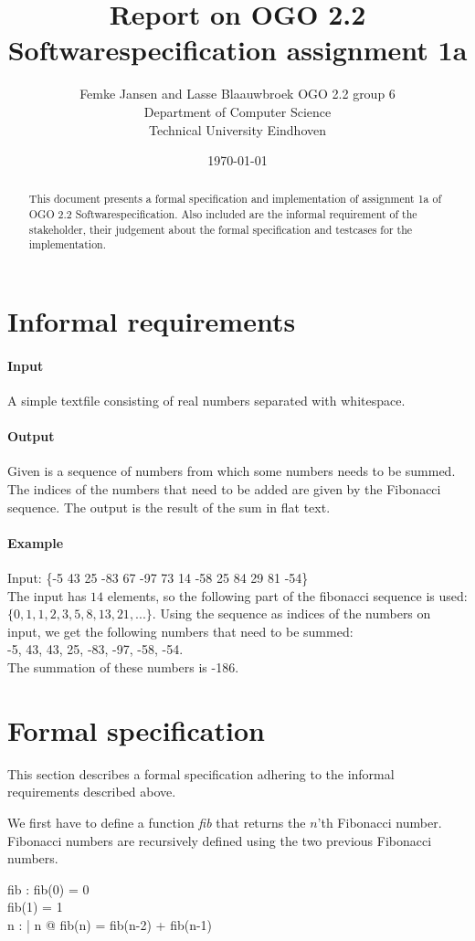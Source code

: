 \documentclass[12pt]{article}
\title{Report on OGO 2.2 Softwarespecification assignment 1a}
\author{
        Femke Jansen and Lasse Blaauwbroek OGO 2.2 group 6 \\
                Department of Computer Science\\
        Technical University Eindhoven\\
}
\date{\today}
\begin{document}
\maketitle

\begin{abstract}
This document presents a formal specification and implementation of assignment 1a of OGO 2.2 Softwarespecification. Also included are the informal requirement of the stakeholder, their judgement about the formal specification and testcases for the implementation.
\end{abstract}

\section{Informal requirements}
\paragraph{Input} A simple textfile consisting of real numbers separated with whitespace.
\paragraph{Output} Given is a sequence of numbers from which some numbers needs to be summed. The indices of the numbers that need to be added are given by the Fibonacci sequence. The output is the result of the sum in flat text.
\paragraph{Example}
Input: \{-5 43 25 -83  67 -97  73  14  -58 25  84   29 81  -54\}\\
The input has $14$ elements, so the following part of the fibonacci sequence is used: $\{0, 1, 1, 2, 3, 5, 8, 13, 21, ...\}$. Using the sequence as indices of the numbers on input, we get the following numbers that need to be summed: \\ -5, 43, 43, 25, -83, -97, -58, -54. \\ The summation of these numbers is -186.

\section{Formal specification}

This section describes a formal specification adhering to the informal requirements described above.

We first have to define a function  \textit{fib} that returns the $n$'th Fibonacci number. Fibonacci numbers are recursively defined using the two previous Fibonacci numbers.
\begin{axdef}
fib : \nat \fun \nat
\where
fib(0) = 0 \\
fib(1) = 1 \\
\forall n : \nat | n  @ fib(n) = fib(n-2) + fib(n-1)
\end{axdef}
\end{document}
